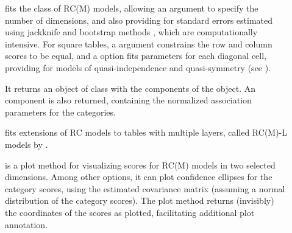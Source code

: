 \documentclass[11pt]{book}\usepackage[]{graphicx}\usepackage[]{color}
\begin{document}
\begin{description}
  \item[] fits the class of RC(M) models, allowing an argument  to
  specify the number of dimensions, and also providing for
  standard errors
  estimated using jackknife and bootstrap methods \citep{MilanWhittaker:1995},
  which are computationally intensive.  For square tables, a 
  argument constrains the row and column scores to be equal, and a
   option fits parameters for each diagonal cell,
  providing for models of quasi-independence and quasi-symmetry (see ).

  It returns an object of class  with the components of the
   object. An  component is also returned, containing
  the normalized association parameters for the categories.
  \item[] fits extensions of RC models to tables with multiple layers,
  called RC(M)-L models by \cite{Wong:2010}.
  \item[] is a plot method for visualizing scores for RC(M) models
  in two selected dimensions. Among other options, it can plot confidence
  ellipses for the category scores, using the estimated covariance matrix
  (assuming a normal distribution of the category scores). The plot method
  returns (invisibly) the coordinates of the scores as plotted, facilitating
  additional plot annotation.
\end{description}
\end{document}
